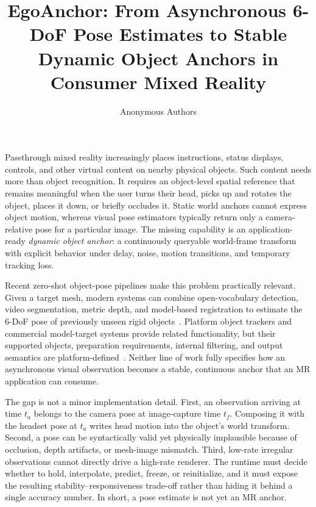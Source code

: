 \documentclass[review]{vgtc}
\title{EgoAnchor: From Asynchronous 6-DoF Pose Estimates to Stable Dynamic Object Anchors in Consumer Mixed Reality}
\author{Anonymous Authors}
\begin{document}
\maketitle

Passthrough mixed reality increasingly places instructions, status displays, controls, and other virtual content on nearby physical objects. Such content needs more than object recognition. It requires an object-level spatial reference that remains meaningful when the user turns their head, picks up and rotates the object, places it down, or briefly occludes it. Static world anchors cannot express object motion, whereas visual pose estimators typically return only a camera-relative pose for a particular image. The missing capability is an application-ready \emph{dynamic object anchor}: a continuously queryable world-frame transform with explicit behavior under delay, noise, motion transitions, and temporary tracking loss.

Recent zero-shot object-pose pipelines make this problem practically relevant. Given a target mesh, modern systems can combine open-vocabulary detection, video segmentation, metric depth, and model-based registration to estimate the 6-DoF pose of previously unseen rigid objects~\cite{posecnn2017,densefusion2019,cosypose2020,megapose2022,foundationpose2023}. Platform object trackers and commercial model-target systems provide related functionality, but their supported objects, preparation requirements, internal filtering, and output semantics are platform-defined~\cite{appleObjectAnchor,azureObjectAnchors,vuforiaModelTargets,metaDynamicObjectTracker}. Neither line of work fully specifies how an asynchronous visual observation becomes a stable, continuous anchor that an MR application can consume.

The gap is not a minor implementation detail. First, an observation arriving at time $t_a$ belongs to the camera pose at image-capture time $t_f$. Composing it with the headset pose at $t_a$ writes head motion into the object's world transform. Second, a pose can be syntactically valid yet physically implausible because of occlusion, depth artifacts, or mesh-image mismatch. Third, low-rate irregular observations cannot directly drive a high-rate renderer. The runtime must decide whether to hold, interpolate, predict, freeze, or reinitialize, and it must expose the resulting stability--responsiveness trade-off rather than hiding it behind a single accuracy number. In short, a pose estimate is not yet an MR anchor.
\end{document}
